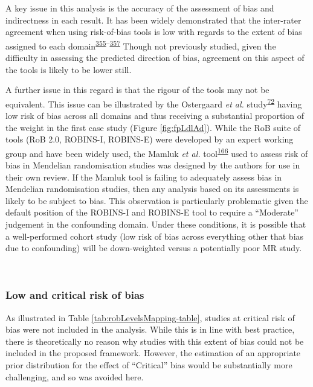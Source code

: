 \documentclass[a4paper, twoside]{templates/ociamthesis}
\begin{document}
A key issue in this analysis is the accuracy of the assessment of bias and indirectness in each result. It has been widely demonstrated that the inter-rater agreement when using risk-of-bias tools is low with regards to the extent of bias assigned to each domain\textsuperscript{\protect\hyperlink{ref-hartling2011}{355}--\protect\hyperlink{ref-minozzi2020}{357}} Though not previously studied, given the difficulty in assessing the predicted direction of bias, agreement on this aspect of the tools is likely to be lower still.

A further issue in this regard is that the rigour of the tools may not be equivalent. This issue can be illustrated by the Ostergaard \emph{et al.} study\textsuperscript{\protect\hyperlink{ref-ostergaard2015}{72}} having low risk of bias across all domains and thus receiving a substantial proportion of the weight in the first case study (Figure \ref{fig:fpLdlAd}). While the RoB suite of tools (RoB 2.0, ROBINS-I, ROBINS-E) were developed by an expert working group and have been widely used, the Mamluk \emph{et al.} tool\textsuperscript{\protect\hyperlink{ref-mamluk2020}{166}} used to assess risk of bias in Mendelian randomisation studies was designed by the authors for use in their own review. If the Mamluk tool is failing to adequately assess bias in Mendelian randomisation studies, then any analysis based on its assessments is likely to be subject to bias. This observation is particularly problematic given the default position of the ROBINS-I and ROBINS-E tool to require a ``Moderate'' judgement in the confounding domain. Under these conditions, it is possible that a well-performed cohort study (low risk of bias across everything other that bias due to confounding) will be down-weighted versus a potentially poor MR study.

~

\hypertarget{low-and-critical-risk-of-bias}{%
\subsubsection{Low and critical risk of bias}\label{low-and-critical-risk-of-bias}}

As illustrated in Table \ref{tab:robLevelsMapping-table}, studies at critical risk of bias were not included in the analysis. While this is in line with best practice, there is theoretically no reason why studies with this extent of bias could not be included in the proposed framework. However, the estimation of an appropriate prior distribution for the effect of ``Critical'' bias would be substantially more challenging, and so was avoided here.
\end{document}
